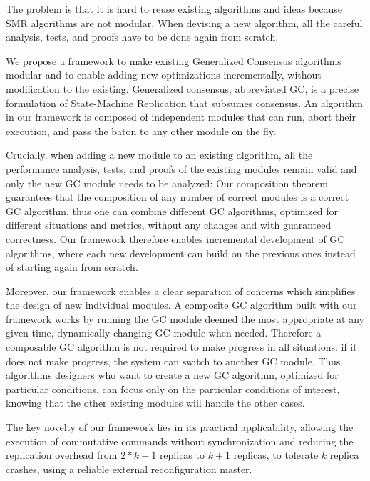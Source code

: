 The problem is that it is hard to reuse existing algorithms and ideas because SMR algorithms are not modular. When devising a new algorithm, all the careful analysis, tests, and proofs have to be done again from scratch.

We propose a framework to make existing Generalized Consensus algorithms modular and to enable adding new optimizations incrementally, without modification to the existing. Generalized consensus, abbreviated GC, is a precise formulation of State-Machine Replication that subsumes consensus.
An algorithm in our framework is composed of independent modules that can run, abort their execution, and pass the baton to any other module on the fly.

Crucially, when adding a new module to an existing algorithm, all the performance analysis, tests, and proofs of the existing modules remain valid and only the new GC module needs to be analyzed: Our composition theorem guarantees that the composition of any number of correct modules is a correct GC algorithm, thus one can combine different GC algorithms, optimized for different situations and metrics, without any changes and with guaranteed correctness.
Our framework therefore enables incremental development of GC algorithms, where each new development can build on the previous ones instead of starting again from scratch.

Moreover, our framework enables a clear separation of concerns  which simplifies the design of new individual modules.
A composite GC algorithm built with our framework works by running the GC module deemed the most appropriate at any given time, dynamically changing GC module when needed. Therefore a composable GC algorithm is not required to make progress in all situations: if it does not make progress, the system can switch to another GC module.
Thus algorithms designers who want to create a new GC algorithm, optimized for particular conditions, can focus only on the particular conditions of interest, knowing that the other existing modules will handle the other cases. 

The key novelty of our framework lies in its practical applicability, allowing the execution of commutative commands without synchronization and reducing the replication overhead from $2*k+1$ replicas to $k+1$ replicas, to tolerate $k$ replica crashes, using a reliable external reconfiguration master.

